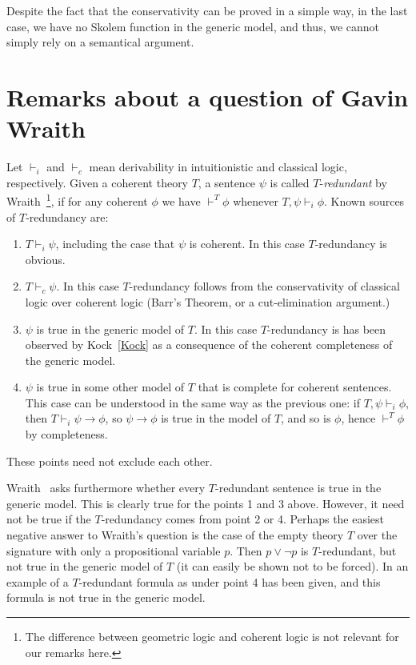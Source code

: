 \documentclass[10pt,a4paper]{article}
\begin{document}
\medskip

 Despite the fact that the conservativity can be proved in a simple way, in the last case, we
have no Skolem function in the generic model, and thus, we cannot simply rely on a semantical
argument.

\section{Remarks about a question of Gavin Wraith}

Let $\vdash_i$ and $\vdash_c$ mean derivability in intuitionistic and classical logic,
respectively. Given a coherent theory $T$, 
a sentence $\psi$ is called $T$-\emph{redundant} by
Wraith~\cite[p. 336]{Wraith}\footnote{The difference
between geometric logic and coherent logic is not relevant for our remarks here.},
if for any coherent $\phi$ we have
$\vdash^T \phi$ whenever $T,\psi \vdash_i \phi$.
Known sources of $T$-redundancy are:
\begin{enumerate}
\item $T \vdash_i \psi$, including the case that $\psi$ is coherent.
In this case $T$-redundancy is obvious.
\item $T \vdash_c \psi$. In this case $T$-redundancy follows from the conservativity
of classical logic over coherent logic (Barr's Theorem, or a cut-elimination argument.)
\item $\psi$ is true in the generic model of $T$. In this case $T$-redundancy is
has been observed by Kock~\ref{Kock} as a consequence of the coherent 
completeness of the generic model.
\item $\psi$ is true in some other model of $T$ that is complete for coherent 
sentences. This case can be understood in the same way as the previous one: 
if $T,\psi \vdash_i \phi$, then $T \vdash_i \psi\to\phi$, so $\psi\to\phi$ is true in
the model of $T$, and so is $\phi$, hence $\vdash^{T} \phi$ by completeness.
\end{enumerate}
These points need not exclude each other.

Wraith~\cite[p. 336]{Wraith} asks furthermore whether every $T$-redundant
sentence is true in the generic model. This is clearly true for the points 1 and 3 above.
However, it need not be true if the $T$-redundancy comes from point 2 or 4.
Perhaps the easiest negative answer to Wraith's question is the case of
the empty theory $T$ over the signature with only a propositional variable $p$.
Then $p\lor\neg p$ is $T$-redundant, but not true in the generic model of $T$
(it can easily be shown not to be forced). In \cite{BBC18} an example of
a $T$-redundant formula as under point 4 has been given, and this formula is
not true in the generic model.
\end{document}
